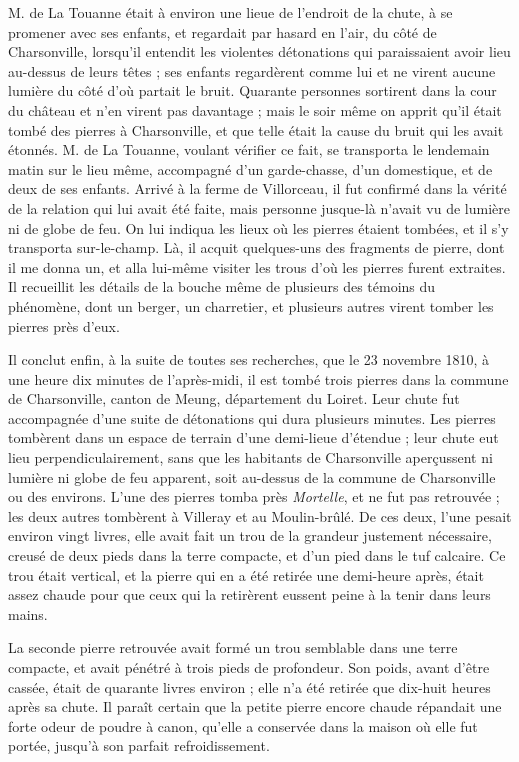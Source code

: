\documentclass[a4paper, 12pt, oneside, french]{article}
\begin{document}
M. de La Touanne était à environ une lieue de l'endroit de la chute, à se promener avec ses enfants, et regardait par hasard en l'air, du côté de Charsonville, lorsqu'il entendit les violentes détonations qui paraissaient avoir lieu au-dessus de leurs têtes ; ses enfants regardèrent comme lui et ne virent aucune lumière du côté d'où partait le bruit. Quarante personnes sortirent dans la cour du château et n'en virent pas davantage ; mais le soir même on apprit qu'il était tombé des pierres à Charsonville, et que telle était la cause du bruit qui les avait étonnés. M. de La Touanne, voulant vérifier ce fait, se transporta le lendemain matin sur le lieu même, accompagné d'un garde-chasse, d'un domestique, et de deux de ses enfants. Arrivé à la ferme de Villorceau, il fut confirmé dans la vérité de la relation qui lui avait été faite, mais personne jusque-là n'avait vu de lumière ni de globe de feu. On lui indiqua les lieux où les pierres étaient tombées, et il s'y transporta sur-le-champ. Là, il acquit quelques-uns des fragments de pierre, dont il me donna un, et alla lui-même visiter les trous d'où les pierres furent extraites. Il recueillit les détails de la bouche même de plusieurs des témoins du phénomène, dont un berger, un charretier, et plusieurs autres virent tomber les pierres près d'eux.

Il conclut enfin, à la suite de toutes ses recherches, que le 23 novembre 1810, à une heure dix minutes de l'après-midi, il est tombé trois pierres dans la commune de Charsonville, canton de Meung, département du Loiret. Leur chute fut accompagnée d'une suite de détonations qui dura plusieurs minutes. Les pierres tombèrent dans un espace de terrain d'une demi-lieue d'étendue ; leur chute eut lieu perpendiculairement, sans que les habitants de Charsonville aperçussent ni lumière ni globe de feu apparent, soit au-dessus de la commune de Charsonville ou des environs. L'une des pierres tomba près \emph{Mortelle}, et ne fut pas retrouvée ; les deux autres tombèrent à Villeray et au Moulin-brûlé. De ces deux, l'une pesait environ vingt livres, elle avait fait un trou de la grandeur justement nécessaire, creusé de deux pieds dans la terre compacte, et d'un pied dans le tuf calcaire. Ce trou était vertical, et la pierre qui en a été retirée une demi-heure après, était assez chaude pour que ceux qui la retirèrent eussent peine à la tenir dans leurs mains.

La seconde pierre retrouvée avait formé un trou semblable dans une terre compacte, et avait pénétré à trois pieds de profondeur. Son poids, avant d'être cassée, était de quarante livres environ ; elle n'a été retirée que dix-huit heures après sa chute. Il paraît certain que la petite pierre encore chaude répandait une forte odeur de poudre à canon, qu'elle a conservée dans la maison où elle fut portée, jusqu'à son parfait refroidissement.
\end{document}
